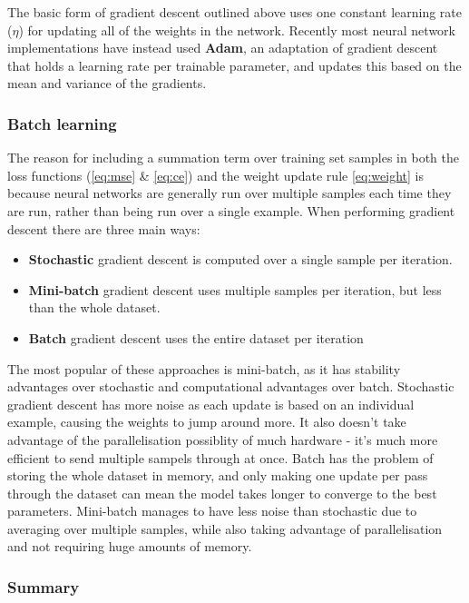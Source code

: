 \documentclass[12pt,a4paper,twoside,openright]{report}
\begin{document}
The basic form of gradient descent outlined above uses one constant learning rate ($\eta$) for updating all
of the weights in the network. Recently most neural network implementations have instead used \textbf{Adam}, an adaptation of gradient descent that holds
a learning rate per trainable parameter, and updates this based on the mean and variance of the gradients.

\subsubsection{Batch learning}

The reason for including a summation term over training set samples in both the loss functions (\eqref{eq:mse} \& \eqref{eq:ce}) and the weight update rule \eqref{eq:weight}
is because neural networks are generally run over multiple samples each time they are run, rather than being run over a single example. When performing gradient descent there
are three main ways:
\begin{itemize}
  \item \textbf{Stochastic} gradient descent is computed over a single sample per iteration.
  \item \textbf{Mini-batch} gradient descent uses multiple samples per iteration, but less than the whole dataset.
  \item \textbf{Batch} gradient descent uses the entire dataset per iteration
\end{itemize}

The most popular of these approaches is mini-batch, as it has stability advantages over stochastic and computational advantages over batch. Stochastic gradient
descent has more noise as each update is based on an individual example, causing the weights to jump around more. It also doesn't take advantage of the 
parallelisation possiblity of much hardware - it's much more efficient to send multiple sampels through at once. Batch has the problem of storing the whole 
dataset in memory, and only making one update per pass through the dataset can mean the model takes longer to converge to the best parameters. Mini-batch manages to
have less noise than stochastic due to averaging over multiple samples, while also taking advantage of parallelisation and not requiring huge amounts of memory.

\subsubsection{Summary}
\end{document}
